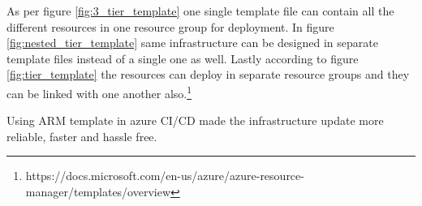 As per figure \ref{fig:3_tier_template} one single template file can contain all the different resources in one resource group for deployment. In figure \ref{fig:nested_tier_template} same infrastructure can be designed in separate template files instead of a single one as well. Lastly according to figure \ref{fig:tier_template} the resources can deploy in separate resource groups and they can be linked with one another also.\footnote{https://docs.microsoft.com/en-us/azure/azure-resource-manager/templates/overview}

Using ARM template in azure CI/CD made the infrastructure update more reliable, faster and hassle free.